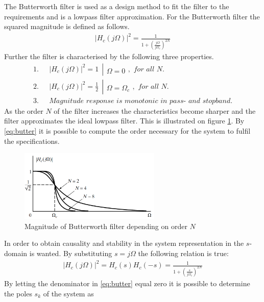 The Butterworth filter is used as a design method to fit the filter to the requirements and is a lowpass filter approximation. For the Butterworth filter the squared magnitude is defined as follows.
\begin{align}\label{eq:butter}
|H_c(j\Omega)|^2=\frac{1}{1+\left( \frac{j\Omega}{j\Omega_c}\right)^{2N}}
\end{align} 
Further the filter is characterised by the following three properties.
\begin{align}
1.& \ \ \ |H_c(j\Omega)|^2 = 1 \  \ \left|\begin{matrix}
\\ 
\Omega=0
\end{matrix}\right. , \textit{ for all }N. \\
2.& \ \ \ |H_c(j\Omega)|^2 = \frac{1}{2} \  \ \left|\begin{matrix}
\\ 
\Omega=\Omega_c
\end{matrix}\right. , \textit{ for all }N. \\
3.& \ \ \ \textit{Magnitude response is monotonic in pass- and stopband.}
\end{align}
As the order $N$ of the filter increases the characteristics become sharper and the filter approximates the ideal lowpass filter. This is illustrated on figure \ref{fig:butter}. By \eqref{eq:butter} it is possible to compute the order necessary for the system to fulfil the specifications.            
\begin{figure}[H]
    \centering
    \includegraphics[width = 0.6\textwidth]{figures/butterworth.png}
    \caption{Magnitude of Butterworth filter depending on order $N$ }
    \label{fig:butter}
\end{figure} 
In order to obtain causality and stability in the system representation in the $s$-domain is wanted. By substituting $s=j\Omega$ the following relation is true:
\begin{align}
|H_c(j\Omega)|^2 = H_c(s)H_c(-s)= \frac{1}{1+\left( \frac{s}{j\Omega_c}\right)^{2N}}
\end{align} 
By letting the denominator in \eqref{eq:butter} equal zero it is possible to determine the poles $s_k$ of the system as 
